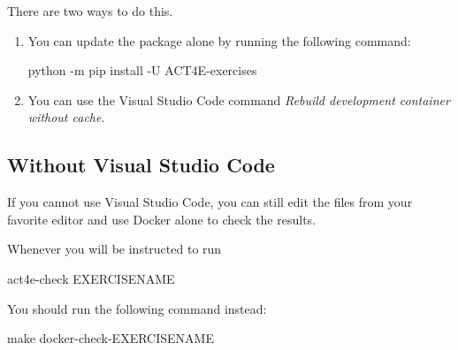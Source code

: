 There are two ways to do this.
\begin{enumerate}
    \item You can update the package alone by running the following command:

    \begin{console}
        python -m pip install -U ACT4E-exercises
    \end{console}
    \item You can use the Visual Studio Code command \emph{Rebuild development container without cache}.
\end{enumerate}

%
%
%
%
%
%
%
%
%

\subsection{Without Visual Studio Code}

If you cannot use Visual Studio Code, you can still edit the files from your favorite editor and use Docker alone
to check the results.

Whenever you will be instructed to run
\begin{console}
    act4e-check EXERCISENAME
\end{console}
You should run the following command instead:
\begin{console}
make docker-check-EXERCISENAME
\end{console}

